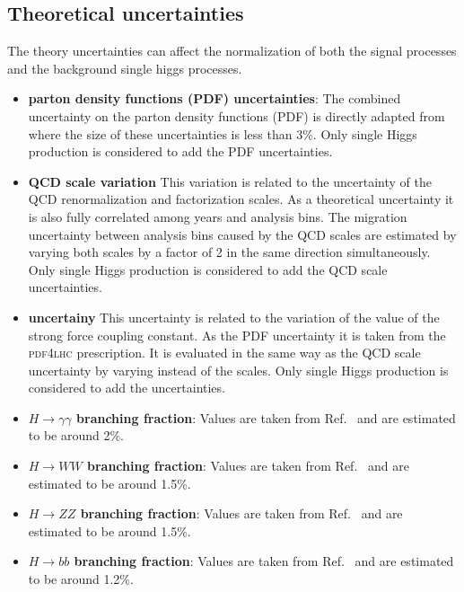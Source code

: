  \subsection{Theoretical uncertainties}
The theory uncertainties can affect the normalization of both the signal processes and the background single higgs processes.
\begin{itemize}
    \item \textbf{parton density functions (PDF) uncertainties}: The combined uncertainty on the parton density functions (PDF) is directly adapted from ~\cite{CMS:gghhrecommendations} where the size of these uncertainties is less than 3\%. Only single Higgs production is considered to add the PDF uncertainties.
\end{itemize}
\begin{itemize}
      \item \textbf{QCD scale variation} This variation is related to the uncertainty of the QCD renormalization and factorization scales. As a theoretical uncertainty it is also fully correlated among years and analysis bins. The migration uncertainty between analysis bins caused by the QCD scales are estimated by varying both scales by a factor of 2 in the same direction simultaneously. Only single Higgs production is considered to add the QCD scale uncertainties.
  \end{itemize}
\begin{itemize}
      \item \textbf{\alpS uncertainy} This uncertainty is related to the variation of the value of the strong force coupling constant. As the PDF uncertainty it is taken from the \textsc{pdf4lhc} prescription. It is evaluated in the same way as the QCD scale uncertainty by varying \alpS instead of the scales. Only single Higgs production is considered to add the \alpS uncertainties.
  \end{itemize}
  \begin{itemize}
      \item \textbf{$H \rightarrow \gamma\gamma$ branching fraction}: Values are taken from Ref.~\cite{florian2016handbook} and are estimated to be around 2\%.
      \item \textbf{$H \rightarrow WW$ branching fraction}: Values are taken from Ref.~\cite{run2HHcombination} and are estimated to be around 1.5\%.
      \item \textbf{$H \rightarrow ZZ$ branching fraction}: Values are taken from Ref.~\cite{run2HHcombination} and are estimated to be around 1.5\%.
      \item \textbf{$H \rightarrow bb$ branching fraction}: Values are taken from Ref.~\cite{run2HHcombination} and are estimated to be around 1.2\%.
  \end{itemize}

